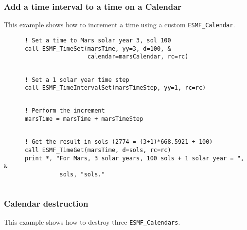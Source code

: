 
  \subsubsection{Add a time interval to a time on a Calendar}
 
   This example shows how to increment a time using a custom {\tt ESMF\_Calendar}. 

 \begin{verbatim}
      ! Set a time to Mars solar year 3, sol 100
      call ESMF_TimeSet(marsTime, yy=3, d=100, &
                        calendar=marsCalendar, rc=rc)
 
\end{verbatim}
 

 \begin{verbatim}
      ! Set a 1 solar year time step
      call ESMF_TimeIntervalSet(marsTimeStep, yy=1, rc=rc)
 
\end{verbatim}
 

 \begin{verbatim}
      ! Perform the increment
      marsTime = marsTime + marsTimeStep
 
\end{verbatim}
 

 \begin{verbatim}
      ! Get the result in sols (2774 = (3+1)*668.5921 + 100)
      call ESMF_TimeGet(marsTime, d=sols, rc=rc)
      print *, "For Mars, 3 solar years, 100 sols + 1 solar year = ", &
                sols, "sols."
 
\end{verbatim}
 

  \subsubsection{Calendar destruction}
 
   This example shows how to destroy three {\tt ESMF\_Calendars}. 

